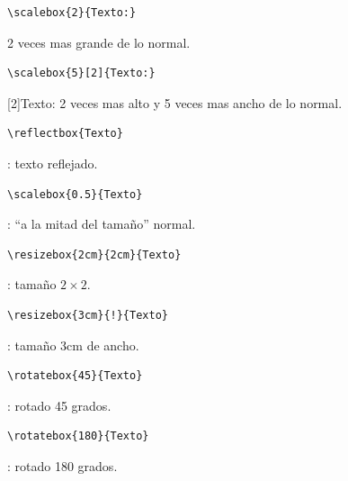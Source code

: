 \documentclass[a4,10pt]{aleph-notas}
\begin{document}
\begin{lstlisting}[frame=single]
\scalebox{2}{Texto:}
\end{lstlisting}

 2 veces mas grande de lo normal.

\vspace{12pt}

\begin{lstlisting}[frame=single]
\scalebox{5}[2]{Texto:}
\end{lstlisting}

\scalebox{5}[2]{Texto:} 2 veces mas alto y 5 veces mas ancho de lo normal.

\vspace{12pt}

\begin{lstlisting}[frame=single]
\reflectbox{Texto}
\end{lstlisting}

: texto reflejado.

\vspace{12pt}

\begin{lstlisting}[frame=single]
\scalebox{0.5}{Texto}
\end{lstlisting}

: ``a la mitad del tamaño'' normal.

\begin{lstlisting}[frame=single]
\resizebox{2cm}{2cm}{Texto}
\end{lstlisting}

: tamaño $2\times 2$.

\begin{lstlisting}[frame=single]
\resizebox{3cm}{!}{Texto}
\end{lstlisting}

: tamaño 3cm de ancho.

\begin{lstlisting}[frame=single]
\rotatebox{45}{Texto}
\end{lstlisting}

\begin{center}
    : rotado 45 grados.
\end{center}

\begin{lstlisting}[frame=single]
\rotatebox{180}{Texto}
\end{lstlisting}

\begin{center}
    : rotado 180 grados.
\end{center}
\end{document}
